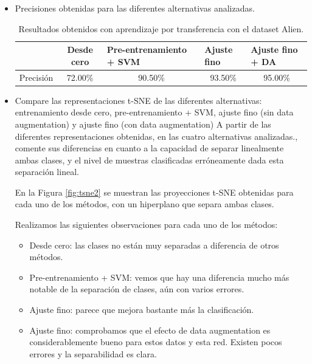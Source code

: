 \documentclass[12pt]{scrartcl}
\begin{document}
\begin{itemize}
    \item Precisiones obtenidas para las diferentes alternativas analizadas.
    \begin{table}[H]
    \centering
    \begin{tabular}{l c l l l}
    \multicolumn{1}{c}{}            & \cellcolor[HTML]{E3E7EC}Desde cero & \cellcolor[HTML]{E3E7EC}Pre-entrenamiento + SVM & \cellcolor[HTML]{E3E7EC}Ajuste fino & \cellcolor[HTML]{E3E7EC}Ajuste fino + DA \\ \hline
    \cellcolor[HTML]{E3E7EC}Precisión &  \multicolumn{1}{c}{72.00\%} & \multicolumn{1}{c}{90.50\%}  & \multicolumn{1}{c}{93.50\%} & \multicolumn{1}{c}{95.00\%}\\ 
    \end{tabular}
    \caption{Resultados obtenidos con aprendizaje por transferencia con el dataset Alien.}
    \label{table:restrans}
    \end{table}
    \item Compare las representaciones t-SNE de las diferentes alternativas: entrenamiento desde cero, pre-entrenamiento + SVM, ajuste fino (sin data augmentation) y ajuste fino (con data augmentation) A partir de las diferentes representaciones obtenidas, en las cuatro alternativas analizadas., comente sus diferencias en cuanto a la capacidad de separar linealmente ambas clases, y el nivel de muestras clasificadas erróneamente dada esta separación lineal.
    
    En la Figura \ref{fig:tsne2} se muestran las proyecciones t-SNE obtenidas para cada uno de los métodos, con un hiperplano que separa ambas clases.
    
    Realizamos las siguientes observaciones para cada uno de los métodos:
    
    \begin{itemize}
        \item Desde cero: las clases no están muy separadas a diferencia de otros métodos.
        \item Pre-entrenamiento + SVM: vemos que hay una diferencia mucho más notable de la separación de clases, aún con varios errores.
        \item Ajuste fino: parece que mejora bastante más la clasificación.
        \item Ajuste fino: comprobamos que el efecto de data augmentation es considerablemente bueno para estos datos y esta red. Existen pocos errores y la separabilidad es clara.
    \end{itemize}
    

\end{itemize}
\end{document}
